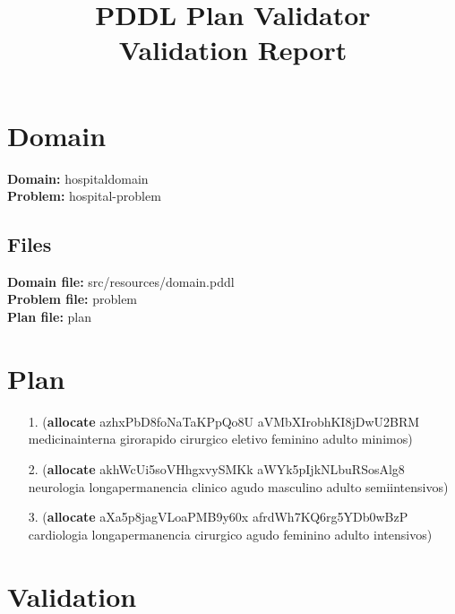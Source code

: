 \documentclass{article}
\title{\textbf{PDDL Plan Validator}\\Validation Report}
\date{} %
\begin{document}
\maketitle

\section{Domain}
\textbf{Domain:}  hospitaldomain\\
\textbf{Problem:} hospital-problem

\subsection{Files}
\textbf{Domain file:}  src/resources/domain.pddl \\
\textbf{Problem file:} problem\\
\textbf{Plan file:}    plan

\section{Plan}

\begin{itemize}
    \item[1.] (\textbf{allocate} azhxPbD8foNaTaKPpQo8U aVMbXIrobhKI8jDwU2BRM medicinainterna girorapido cirurgico eletivo feminino adulto minimos)
    \item[2.] (\textbf{allocate} akhWcUi5soVHhgxvySMKk aWYk5pIjkNLbuRSosAlg8 neurologia longapermanencia clinico agudo masculino adulto semiintensivos)
    \item[3.] (\textbf{allocate} aXa5p8jagVLoaPMB9y60x afrdWh7KQ6rg5YDb0wBzP cardiologia longapermanencia cirurgico agudo feminino adulto intensivos)
\end{itemize}

\section{Validation}
\end{document}
